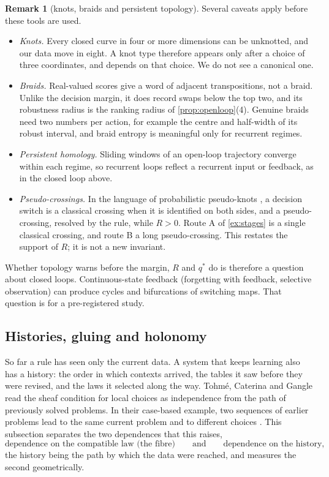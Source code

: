 \documentclass[11pt]{article}
\theoremstyle{definition}\newtheorem{definition}[theorem]{Definition}\newtheorem{remark}[theorem]{Remark}\newtheorem{example}[theorem]{Example}\newtheorem{problem}[theorem]{Open problem}\crefname{problem}{Problem}{Problems}
\begin{document}
\begin{remark}[knots, braids and persistent topology]\label{rem:topology}
Several caveats apply before these tools are used.
\begin{itemize}
\item \emph{Knots.} Every closed curve in four or more dimensions can be unknotted, and our data move in eight. A knot type therefore appears only after a choice of three coordinates, and depends on that choice. We do not see a canonical one.
\item \emph{Braids.} Real-valued scores give a word of adjacent transpositions, not a braid. Unlike the decision margin, it does record swaps below the top two, and its robustness radius is the ranking radius of \cref{prop:openloop}(4). Genuine braids need two numbers per action, for example the centre and half-width of its robust interval, and braid entropy is meaningful only for recurrent regimes.
\item \emph{Persistent homology.} Sliding windows of an open-loop trajectory converge within each regime, so recurrent loops reflect a recurrent input or feedback, as in the closed loop above.
\item \emph{Pseudo-crossings.} In the language of probabilistic pseudo-knots \cite{DiamantisKauffman2026}, a decision switch is a classical crossing when it is identified on both sides, and a pseudo-crossing, resolved by the rule, while $R>0$. Route A of \cref{ex:stages} is a single classical crossing, and route B a long pseudo-crossing. This restates the support of $R$; it is not a new invariant.
\end{itemize}
Whether topology warns before the margin, $R$ and $q^*$ do is therefore a question about closed loops. Continuous-state feedback (forgetting with feedback, selective observation) can produce cycles and bifurcations of switching maps. That question is for a pre-registered study.
\end{remark}

\subsection{Histories, gluing and holonomy}\label{sec:history}
So far a rule has seen only the current data. A system that keeps learning also has a history: the order in which contexts arrived, the tables it saw before they were revised, and the laws it selected along the way. Tohm\'e, Caterina and Gangle read the sheaf condition for local choices as independence from the path of previously solved problems. In their case-based example, two sequences of earlier problems lead to the same current problem and to different choices \cite{TohmeCaterinaGangle2017}. This subsection separates the two dependences that this raises,
\[
\text{dependence on the compatible law (the fibre)}\qquad\text{and}\qquad\text{dependence on the history,}
\]
the history being the path by which the data were reached,
and measures the second geometrically.
\end{document}
